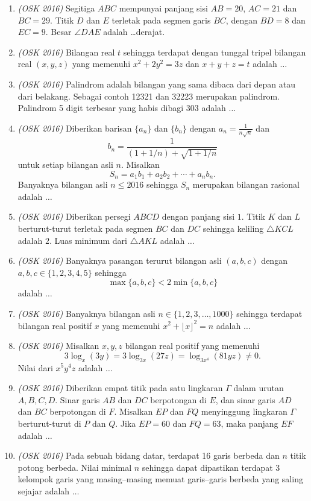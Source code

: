 \begin{enumerate}
	\item \textit{(OSK 2016)} Segitiga $ABC$ mempunyai panjang sisi $AB = 20$, $AC = 21$ dan $BC = 29$. Titik $D$ dan $E$ terletak pada segmen garis $BC$, dengan $BD = 8$ dan $EC = 9$. Besar $\angle DAE$ adalah \dots derajat.
	
	\item \textit{(OSK 2016)} Bilangan real $t$ sehingga terdapat dengan tunggal tripel bilangan real $(x,y,z)$ yang memenuhi $x^2 + 2y^2 = 3z$ dan $x + y + z = t$ adalah $\dots$
	
	\item \textit{(OSK 2016)}  Palindrom adalah bilangan yang sama dibaca dari depan atau dari belakang. Sebagai contoh 12321 dan 32223 merupakan palindrom. Palindrom 5 digit terbesar yang habis dibagi 303 adalah $\dots$
	
	\item \textit{(OSK 2016)}  Diberikan barisan $\{a_n\}$ dan $\{b_n\}$ dengan $a_n = \frac{1}{n\sqrt{n}}$ dan 
	\[
	b_n = \frac{1}{(1 + 1/n) + \sqrt{1 + 1/n}}
	\]
	untuk setiap bilangan asli $n$. Misalkan 
	\[
	S_n = a_1 b_1 + a_2 b_2 + \cdots + a_n b_n.
	\]
	Banyaknya bilangan asli $n \le 2016$ sehingga $S_n$ merupakan bilangan rasional adalah $\dots$
	
	\item \textit{(OSK 2016)} Diberikan persegi $ABCD$ dengan panjang sisi $1$. Titik $K$ dan $L$ berturut-turut terletak pada segmen $BC$ dan $DC$ sehingga keliling $\triangle KCL$ adalah $2$. Luas minimum dari $\triangle AKL$ adalah $\dots$
	
	\item \textit{(OSK 2016)} Banyaknya pasangan terurut bilangan asli $(a,b,c)$ dengan $a,b,c \in \{1,2,3,4,5\}$ sehingga
	\[
	\max\{a,b,c\} < 2\min\{a,b,c\}
	\]
	adalah $\dots$
	
	\item \textit{(OSK 2016)} Banyaknya bilangan asli $n \in \{1,2,3,\dots,1000\}$ sehingga terdapat bilangan real positif $x$ yang memenuhi $x^2 + \lfloor x \rfloor^2 = n$ adalah $\dots$
	
	\item \textit{(OSK 2016)} Misalkan $x,y,z$ bilangan real positif yang memenuhi
	\[
	3\log_x(3y) = 3\log_{3x}(27z) = \log_{3x^4}(81yz) \ne 0.
	\]
	Nilai dari $x^5 y^4 z$ adalah $\dots$
	
	\item \textit{(OSK 2016)} Diberikan empat titik pada satu lingkaran $\Gamma$ dalam urutan $A,B,C,D$. Sinar garis $AB$ dan $DC$ berpotongan di $E$, dan sinar garis $AD$ dan $BC$ berpotongan di $F$. Misalkan $EP$ dan $FQ$ menyinggung lingkaran $\Gamma$ berturut-turut di $P$ dan $Q$. Jika $EP = 60$ dan $FQ = 63$, maka panjang $EF$ adalah $\dots$
	
	\item \textit{(OSK 2016)} Pada sebuah bidang datar, terdapat 16 garis berbeda dan $n$ titik potong berbeda. Nilai minimal $n$ sehingga dapat dipastikan terdapat 3 kelompok garis yang masing–masing memuat garis–garis berbeda yang saling sejajar adalah $\dots$
	
\end{enumerate}

